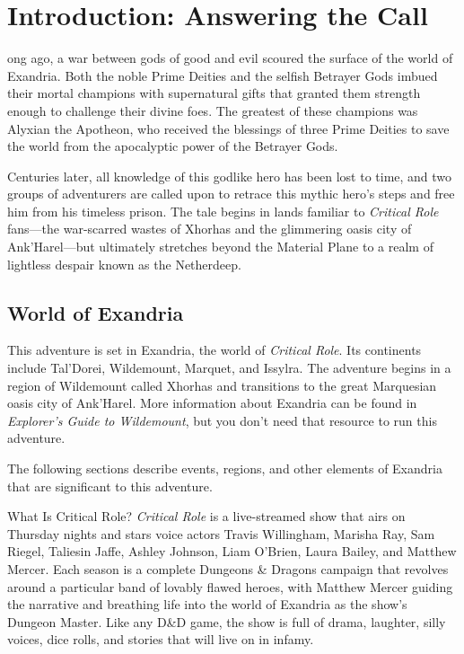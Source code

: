 \documentclass[10pt,a4paper,twoside,fancy,bg=print,twocolumn,openany,nodeprecatedcode]{dndbook}
\begin{document}
\frontmatter
\tableofcontents
\mainmatter
{}
\chapter*{Introduction: Answering the Call}
ong ago, a war between gods of good and evil scoured the surface of the world of Exandria. Both the noble Prime Deities and the selfish Betrayer Gods imbued their mortal champions with supernatural gifts that granted them strength enough to challenge their divine foes. The greatest of these champions was Alyxian the Apotheon, who received the blessings of three Prime Deities to save the world from the apocalyptic power of the Betrayer Gods.


Centuries later, all knowledge of this godlike hero has been lost to time, and two groups of adventurers are called upon to retrace this mythic hero's steps and free him from his timeless prison. The tale begins in lands familiar to \textit{Critical Role} fans—the war-scarred wastes of Xhorhas and the glimmering oasis city of Ank'Harel—but ultimately stretches beyond the Material Plane to a realm of lightless despair known as the Netherdeep.

\section{World of Exandria}
This adventure is set in Exandria, the world of \textit{Critical Role}. Its continents include Tal'Dorei, Wildemount, Marquet, and Issylra. The adventure begins in a region of Wildemount called Xhorhas and transitions to the great Marquesian oasis city of Ank'Harel. More information about Exandria can be found in \textit{Explorer's Guide to Wildemount}, but you don't need that resource to run this adventure.

The following sections describe events, regions, and other elements of Exandria that are significant to this adventure.

\begin{DndSidebar}[float=!b]{What Is Critical Role?}
\textit{Critical Role} is a live-streamed show that airs on Thursday nights and stars voice actors Travis Willingham, Marisha Ray, Sam Riegel, Taliesin Jaffe, Ashley Johnson, Liam O'Brien, Laura Bailey, and Matthew Mercer. Each season is a complete Dungeons \& Dragons campaign that revolves around a particular band of lovably flawed heroes, with Matthew Mercer guiding the narrative and breathing life into the world of Exandria as the show's Dungeon Master. Like any D\&D game, the show is full of drama, laughter, silly voices, dice rolls, and stories that will live on in infamy.



\end{DndSidebar}
\end{document}
